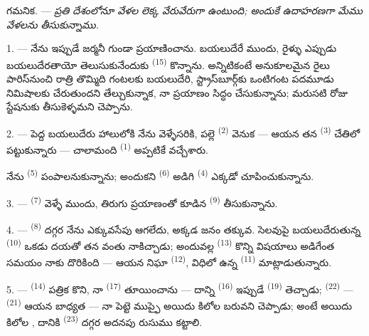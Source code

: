 \VUsaut{4.0mm}
\VUsaut{2.4mm}
\VUsaut{3.4mm}
\textsc{గమనిక.} --- \textit{ప్రతి దేశంలోనూ వేళల లెక్క వేరువేరుగా ఉంటుంది; అందుకే
ఉదాహరణగా మేము}  \textit{వేళలను తీసుకున్నాము.}

1. --- నేను ఇప్పుడే జర్మనీ గుండా ప్రయాణించాను. బయలుదేరే ముందు, రైళ్ళు ఎప్పుడు
బయలుదేరతాయో తెలుసుకునేందుకు  \textsuperscript{(15)} కొన్నాను.
అన్నిటికంటే అనుకూలమైన రైలు పారిస్‌నుంచి రాత్రి తొమ్మిది గంటలకు బయలుదేరి, స్ట్రాస్‌బూర్గ్‌కు
ఒంటిగంట పదమూడు నిమిషాలకు చేరుతుందని తేల్చుకున్నాక, నా ప్రయాణం సిద్ధం చేసుకున్నాను;
మరుసటి రోజు స్టేషనుకు తీసుకెళ్ళమని చెప్పాను.

2. --- పెద్ద బయలుదేరు హాలులోకి నేను వెళ్ళేసరికి, పల్లె 
\textsuperscript{(2)} వెనుక — ఆయన తన  \textsuperscript{(3)}
చేతిలో పట్టుకున్నారు — చాలామంది  \textsuperscript{(1)} అప్పటికే
వచ్చేశారు.

నేను  \textsuperscript{(5)} పంపాలనుకున్నాను; అందుకని
 \textsuperscript{(6)} అడిగి 
\textsuperscript{(4)} ఎక్కడో చూపించుకున్నాను.

3. ---  \textsuperscript{(7)} వెళ్ళే ముందు, తిరుగు ప్రయాణంతో
కూడిన  \textsuperscript{(9)} తీసుకున్నాను.

4. ---  \textsuperscript{(8)} దగ్గర నేను ఎక్కువసేపు ఆగలేదు,
అక్కడ జనం తక్కువ. సెలవుపై బయలుదేరుతున్న  \textsuperscript{(10)} ఒకడు
దయతో తన వంతు నాకిచ్చాడు; అందువల్ల  \textsuperscript{(13)}
కొన్ని విషయాలు అడిగేంత సమయం నాకు దొరికింది — ఆయన నిఘా 
\textsuperscript{(12)}, విధిలో ఉన్న  \textsuperscript{(11)}
మాట్లాడుతున్నారు.

\VUsaut{3.0mm}

5. ---  \textsuperscript{(14)} పత్రిక కొని, నా
 \textsuperscript{(17)} తూయించాను — దాన్ని 
\textsuperscript{(16)} ఇప్పుడే  \textsuperscript{(19)} తెచ్చాడు;
 \textsuperscript{(22)} —  \textsuperscript{(21)}
ఆయన బాధ్యత — నా పెట్టె ముప్ఫై అయిదు కిలోల బరువని చెప్పాడు; అంటే అయిదు కిలోల
, దానికి  \textsuperscript{(23)} దగ్గర అదనపు
రుసుము కట్టాలి.

